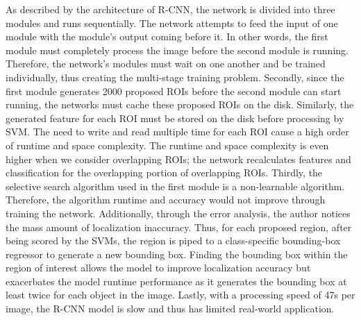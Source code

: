 As described by the architecture of R-CNN, the network is divided into three modules and runs sequentially. The network attempts to feed the input of one module with the module's output coming before it. In other words, the first module must completely process the image before the second module is running. Therefore, the network's modules must wait on one another and be trained individually, thus creating the multi-stage training problem. Secondly, since the first module generates 2000 proposed ROIs before the second module can start running, the networks must cache these proposed ROIs on the disk. Similarly, the generated feature for each ROI must be stored on the disk before processing by SVM. The need to write and read multiple time for each ROI cause a high order of runtime and space complexity. The runtime and space complexity is even higher when we consider overlapping ROIs; the network recalculates features and classification for the overlapping portion of overlapping ROIs. Thirdly, the selective search algorithm used in the first module is a non-learnable algorithm. Therefore, the algorithm runtime and accuracy would not improve through training the network. Additionally, through the error analysis, the author notices the mass amount of localization inaccuracy. Thus, for each proposed region, after being scored by the SVMs, the region is piped to a class-speciﬁc bounding-box regressor to generate a new bounding box. Finding the bounding box within the region of interest allows the model to improve localization accuracy but exacerbates the model runtime performance as it generates the bounding box at least twice for each object in the image. Lastly, with a processing speed of 47s per image, the R-CNN model is slow and thus has limited real-world application.